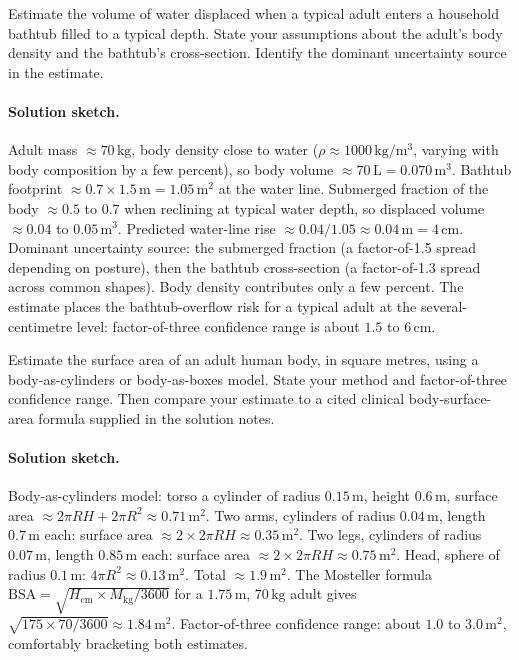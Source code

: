 \begin{exercise}
Estimate the volume of water displaced when a typical adult enters
a household bathtub filled to a typical depth. State your
assumptions about the adult's body density and the bathtub's
cross-section. Identify the dominant uncertainty source in the
estimate.
\end{exercise}

\paragraph{Solution sketch.}
Adult mass $\approx 70 \,\si{\kilogram}$, body density close to
water ($\rho \approx 1000 \,\si{\kilogram\per\meter\cubed}$, varying
with body composition by a few percent), so body volume $\approx
70 \,\si{\liter} = 0.070 \,\si{\meter\cubed}$. Bathtub footprint
$\approx 0.7 \times 1.5 \,\si{\meter} = 1.05 \,\si{\meter\squared}$
at the water line. Submerged fraction of the body $\approx 0.5$ to
$0.7$ when reclining at typical water depth, so displaced volume
$\approx 0.04$ to $0.05 \,\si{\meter\cubed}$. Predicted water-line
rise $\approx 0.04 / 1.05 \approx 0.04 \,\si{\meter} = 4 \,\si
{\centi\meter}$. Dominant uncertainty source: the submerged
fraction (a factor-of-1.5 spread depending on posture), then the
bathtub cross-section (a factor-of-1.3 spread across common shapes).
Body density contributes only a few percent. The estimate places
the bathtub-overflow risk for a typical adult at the
several-centimetre level: factor-of-three confidence range is about
$1.5$ to $6 \,\si{\centi\meter}$.

\begin{exercise}
Estimate the surface area of an adult human body, in square metres,
using a body-as-cylinders or body-as-boxes model. State your method
and factor-of-three confidence range. Then compare your estimate to
a cited clinical body-surface-area formula supplied in the solution
notes.
\end{exercise}

\paragraph{Solution sketch.}
Body-as-cylinders model: torso a cylinder of radius $0.15 \,\si
{\meter}$, height $0.6 \,\si{\meter}$, surface area $\approx 2\pi R
H + 2\pi R^{2} \approx 0.71 \,\si{\meter\squared}$. Two arms,
cylinders of radius $0.04 \,\si{\meter}$, length $0.7 \,\si{\meter}$
each: surface area $\approx 2 \times 2\pi R H \approx 0.35 \,\si
{\meter\squared}$. Two legs, cylinders of radius $0.07 \,\si{\meter}$,
length $0.85 \,\si{\meter}$ each: surface area $\approx 2 \times
2\pi R H \approx 0.75 \,\si{\meter\squared}$. Head, sphere of radius
$0.1 \,\si{\meter}$: $4\pi R^{2} \approx 0.13 \,\si{\meter\squared}$.
Total $\approx 1.9 \,\si{\meter\squared}$. The Mosteller formula
$\text{BSA} = \sqrt{H_{\mathrm{cm}} \times M_{\mathrm{kg}} / 3600}$
for a $1.75 \,\si{\meter}$, $70 \,\si{\kilogram}$ adult gives
$\sqrt{175 \times 70 / 3600} \approx 1.84 \,\si{\meter\squared}$.
Factor-of-three confidence range: about $1.0$ to $3.0 \,\si{\meter
\squared}$, comfortably bracketing both estimates.

